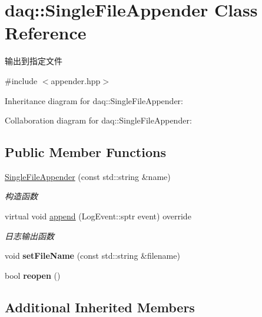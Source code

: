 \hypertarget{classdaq_1_1SingleFileAppender}{}\section{daq\+:\+:Single\+File\+Appender Class Reference}
\label{classdaq_1_1SingleFileAppender}


输出到指定文件  




{\ttfamily \#include $<$appender.\+hpp$>$}



Inheritance diagram for daq\+:\+:Single\+File\+Appender\+:


Collaboration diagram for daq\+:\+:Single\+File\+Appender\+:
\subsection*{Public Member Functions}
\begin{DoxyCompactItemize}
\item 
\hyperlink{classdaq_1_1SingleFileAppender_a6b44636dd0b021d7d4103d4894d10e0a}{Single\+File\+Appender} (const std\+::string \&name)
\begin{DoxyCompactList}\small\item\em 构造函数 \end{DoxyCompactList}\item 
virtual void \hyperlink{classdaq_1_1SingleFileAppender_a1cb74c4e11be30c100c614dbc65e94d6}{append} (Log\+Event\+::sptr event) override
\begin{DoxyCompactList}\small\item\em 日志输出函数 \end{DoxyCompactList}\item 
\mbox{\label{classdaq_1_1SingleFileAppender_ad4b4b8c66e7359d71806dd48a45617a5}} 
void {\bfseries set\+File\+Name} (const std\+::string \&filename)
\item 
\mbox{\label{classdaq_1_1SingleFileAppender_a17594a2f919eeec0f23047103fbffafc}} 
bool {\bfseries reopen} ()
\end{DoxyCompactItemize}
\subsection*{Additional Inherited Members}


